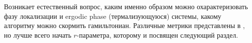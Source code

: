 Возникает естественный вопрос, каким именно образом можно охарактеризовать фазу локализации и ergodic phase (термализующуюся) системы, какому алгоритму можно скормить гамильтониан. Различные метрики представлены в \cite{pal_many-body_2010}, но лучше всего начать $r$-параметра, которому и посвящен следующий раздел. 









